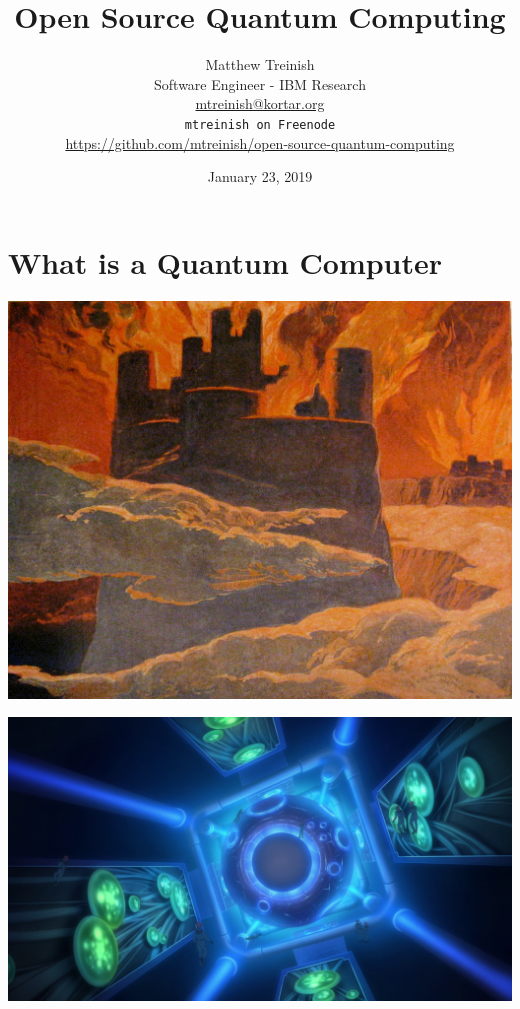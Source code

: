 \documentclass[aspectratio=169,11pt,hyperref={colorlinks=true}]{beamer}
\author[Matthew Treinish]{%
    \texorpdfstring{%
        \centering
        Matthew Treinish\\
        Software Engineer - IBM Research\\
        \href{mailto:mtreinish@kortar.org}{mtreinish@kortar.org}\\
        \texttt{mtreinish on Freenode}\\
        \href{https://github.com/mtreinish/open-source-quantum-computing}{https://github.com/mtreinish/open-source-quantum-computing}
   }
   {Matthew Treinish}
}
\date{January 23, 2019}
\title{Open Source Quantum Computing}
\begin{document}
\titlepage

\section{What is a Quantum Computer}
\begin{frame}
    \includegraphics[width=\textwidth]{Ragnarok.jpg}
\end{frame}

\newcommand{\iu}{{i\mkern1mu}}

\begin{frame}
    \includegraphics[width=\textwidth]{Veda_AD2314.png}
\end{frame}
\end{document}
